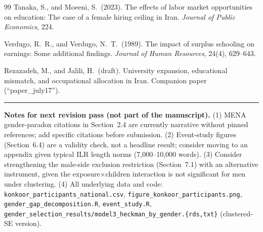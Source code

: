 \documentclass[11pt]{article}
\begin{document}
\begin{thebibliography}{99}
Tanaka, S., and Moeeni, S.\ (2023). The effects of labor market opportunities on education: The case of a female hiring ceiling in Iran. \emph{Journal of Public Economics}, 224.

Verdugo, R.\ R., and Verdugo, N.\ T.\ (1989). The impact of surplus schooling on earnings: Some additional findings. \emph{Journal of Human Resources}, 24(4), 629--643.

Rezazadeh, M., and Jalili, H.\ (draft). University expansion, educational mismatch, and occupational allocation in Iran. Companion paper (``paper\_july17'').

\end{thebibliography}

\vspace{12pt}
\noindent\rule{\textwidth}{0.4pt}
\vspace{4pt}

\noindent\textbf{Notes for next revision pass (not part of the manuscript).} (1) MENA gender-paradox citations in Section~2.4 are currently narrative without pinned references; add specific citations before submission. (2) Event-study figures (Section~6.4) are a validity check, not a headline result; consider moving to an appendix given typical ILR length norms (7,000--10,000 words). (3) Consider strengthening the male-side exclusion restriction (Section~7.1) with an alternative instrument, given the exposure$\times$children interaction is not significant for men under clustering. (4) All underlying data and code: \texttt{konkoor\_participants\_national.csv}, \texttt{figure\_konkoor\_participants.png}, \texttt{gender\_gap\_decomposition.R}, \texttt{event\_study.R}, \texttt{gender\_selection\_results/model3\_heckman\_by\_gender.\{rds,txt\}} (clustered-SE version).
\end{document}
